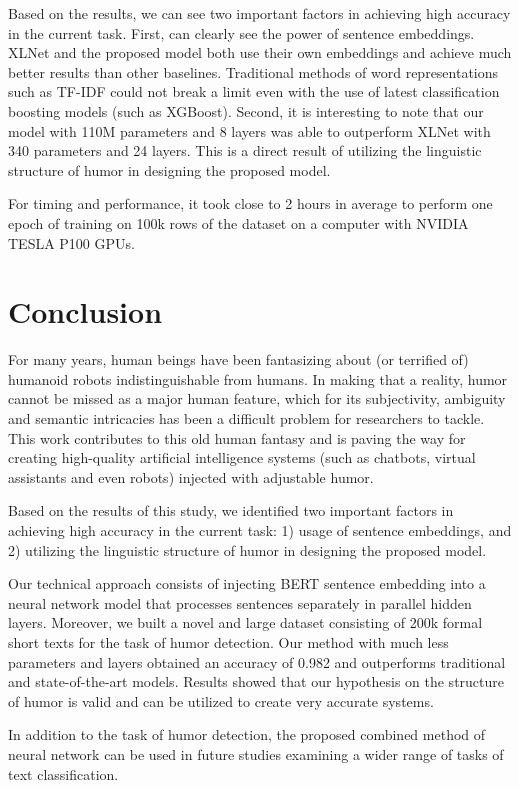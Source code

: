 \documentclass[journal]{IEEEtran}
\begin{document}
Based on the results, we can see two important factors in achieving high accuracy in the current task. First, can clearly see the power of sentence embeddings. XLNet and the proposed model both use their own embeddings and achieve much better results than other baselines. Traditional methods of word representations such as TF-IDF could not break a limit even with the use of latest classification boosting models (such as XGBoost). Second, it is interesting to note that our model with 110M parameters and 8 layers was able to outperform XLNet with 340 parameters and 24 layers. This is a direct result of utilizing the linguistic structure of humor in designing the proposed model.

For timing and performance, it took close to 2 hours in average to perform one epoch of training on 100k rows of the dataset on a computer with NVIDIA TESLA P100 GPUs.


\section{Conclusion}

For many years, human beings have been fantasizing about (or terrified of) humanoid robots indistinguishable from humans. In making that a reality, humor cannot be missed as a major human feature, which for its subjectivity, ambiguity and semantic intricacies has been a difficult problem for researchers to tackle. This work contributes to this old human fantasy and is paving the way for creating high-quality artificial intelligence systems (such as chatbots, virtual assistants and even robots) injected with adjustable humor.

Based on the results of this study, we identified two important factors in achieving high accuracy in the current task: 1) usage of sentence embeddings, and 2) utilizing the linguistic structure of humor in designing the proposed model.

Our technical approach consists of injecting BERT sentence embedding into a neural network model that processes sentences separately in parallel hidden layers. Moreover, we built a novel and large dataset consisting of 200k formal short texts for the task of humor detection. Our method with much less parameters and layers obtained an accuracy of 0.982 and outperforms traditional and state-of-the-art models. Results showed that our hypothesis on the structure of humor is valid and can be utilized to create very accurate systems.

In addition to the task of humor detection, the proposed combined method of neural network can be used in future studies examining a wider range of tasks of text classification.


















\ifCLASSOPTIONcaptionsoff
  \newpage
\fi












\end{document}
